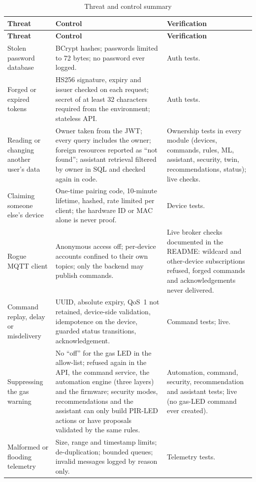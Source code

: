 \documentclass[12pt,a4paper,oneside]{report}
\begin{document}
\begin{longtable}{@{}p{3.0cm}p{6.2cm}p{5.4cm}@{}}
\caption{Threat and control summary}\label{tab:threats}\\
\toprule
\textbf{Threat} & \textbf{Control} & \textbf{Verification}\\
\midrule
\endfirsthead
\toprule
\textbf{Threat} & \textbf{Control} & \textbf{Verification}\\
\midrule
\endhead
Stolen password database & BCrypt hashes; passwords limited to 72 bytes; no password ever logged. & Auth tests.\\
Forged or expired tokens & HS256 signature, expiry and issuer checked on each request; secret of at least 32 characters required from the environment; stateless API. & Auth tests.\\
Reading or changing another user's data & Owner taken from the JWT; every query includes the owner; foreign resources reported as ``not found''; assistant retrieval filtered by owner in SQL and checked again in code. & Ownership tests in every module (devices, commands, rules, ML, assistant, security, twin, recommendations, status); live checks.\\
Claiming someone else's device & One-time pairing code, 10-minute lifetime, hashed, rate limited per client; the hardware ID or MAC alone is never proof. & Device tests.\\
Rogue MQTT client & Anonymous access off; per-device accounts confined to their own topics; only the backend may publish commands. & Live broker checks documented in the README: wildcard and other-device subscriptions refused, forged commands and acknowledgements never delivered.\\
Command replay, delay or misdelivery & UUID, absolute expiry, QoS~1 not retained, device-side validation, idempotence on the device, guarded status transitions, acknowledgement. & Command tests; live.\\
Suppressing the gas warning & No ``off'' for the gas LED in the allow-list; refused again in the API, the command service, the automation engine (three layers) and the firmware; security modes, recommendations and the assistant can only build PIR-LED actions or have proposals validated by the same rules. & Automation, command, security, recommendation and assistant tests; live (no gas-LED command ever created).\\
Malformed or flooding telemetry & Size, range and timestamp limits; de-duplication; bounded queues; invalid messages logged by reason only. & Telemetry tests.\\

\end{longtable}
\end{document}
